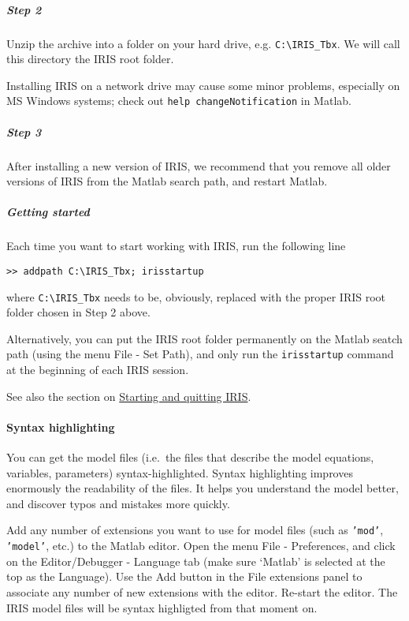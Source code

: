 \subparagraph{Step 2}

Unzip the archive into a folder on your hard drive, e.g.
\texttt{C:\textbackslash{}IRIS\_Tbx}. We will call this directory the
IRIS root folder.

Installing IRIS on a network drive may cause some minor problems,
especially on MS Windows systems; check out
\texttt{help changeNotification} in Matlab.

\subparagraph{Step 3}

After installing a new version of IRIS, we recommend that you remove all
older versions of IRIS from the Matlab search path, and restart Matlab.

\subparagraph{Getting started}

Each time you want to start working with IRIS, run the following line

\begin{verbatim}
>> addpath C:\IRIS_Tbx; irisstartup
\end{verbatim}

where \texttt{C:\textbackslash{}IRIS\_Tbx} needs to be, obviously,
replaced with the proper IRIS root folder chosen in Step 2 above.

Alternatively, you can put the IRIS root folder permanently on the
Matlab seatch path (using the menu File - Set Path), and only run the
\texttt{irisstartup} command at the beginning of each IRIS session.

See also the section on \href{config/Contents}{Starting and quitting
IRIS}.

\paragraph{Syntax highlighting}

You can get the model files (i.e.~the files that describe the model
equations, variables, parameters) syntax-highlighted. Syntax
highlighting improves enormously the readability of the files. It helps
you understand the model better, and discover typos and mistakes more
quickly.

Add any number of extensions you want to use for model files (such as
\texttt{'mod'}, \texttt{'model'}, etc.) to the Matlab editor. Open the
menu File - Preferences, and click on the Editor/Debugger - Language tab
(make sure `Matlab' is selected at the top as the Language). Use the Add
button in the File extensions panel to associate any number of new
extensions with the editor. Re-start the editor. The IRIS model files
will be syntax highligted from that moment on.



